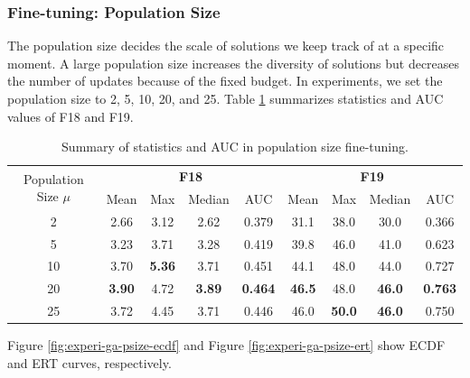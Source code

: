 \documentclass{article}
\begin{document}
\subsubsection{Fine-tuning: Population Size}
The population size decides the scale of solutions we keep track of at a specific moment. A large population size increases the diversity of solutions but decreases the number of updates because of the fixed budget. In experiments, we set the population size to 2, 5, 10, 20, and 25. Table \ref{tab:experi-ga-psize} summarizes statistics and AUC values of F18 and F19.

\begin{table}[!ht]
    \centering
    \caption{Summary of statistics and AUC in population size fine-tuning.}
    \label{tab:experi-ga-psize}
    \begin{tabular}{ccccccccc}
        \toprule
        \multirow{2}[3]{*}{Population Size $\mu$} &
        \multicolumn{4}{c}{\textbf{F18}} &
        \multicolumn{4}{c}{\textbf{F19}}\\
        \cmidrule(lr){2-5}
        \cmidrule(lr){6-9}
        & Mean & Max & Median & AUC & Mean & Max & Median & AUC\\
        \midrule
        2   & 2.66 & 3.12 & 2.62 & 0.379 & 31.1 & 38.0 & 30.0 & 0.366\\
        5   & 3.23 & 3.71 & 3.28 & 0.419 & 39.8 & 46.0 & 41.0 & 0.623\\
        10  & 3.70 & \textbf{5.36} & 3.71 & 0.451 & 44.1 & 48.0 & 44.0 & 0.727\\
        20  & \textbf{3.90} & 4.72 & \textbf{3.89} & \textbf{0.464} & \textbf{46.5} & 48.0 & \textbf{46.0} & \textbf{0.763}\\
        25  & 3.72 & 4.45 & 3.71 & 0.446 & 46.0 & \textbf{50.0} & \textbf{46.0} & 0.750\\
        \bottomrule
    \end{tabular}
\end{table}

Figure \ref{fig:experi-ga-psize-ecdf} and Figure \ref{fig:experi-ga-psize-ert} show ECDF and ERT curves, respectively.
\end{document}
